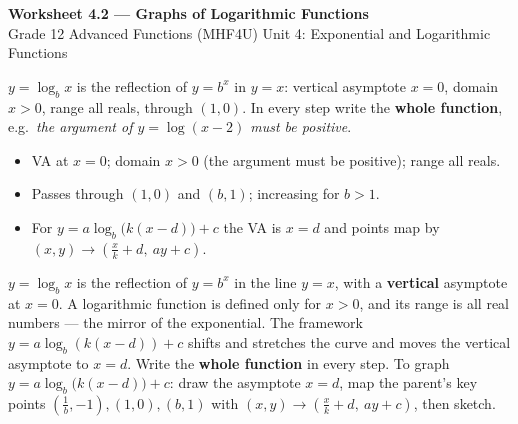 \documentclass[11pt]{article}
\begin{document}
\begin{center}
{\LARGE\bfseries\color{titleblue}Worksheet 4.2 --- Graphs of Logarithmic Functions}\\[2pt]
{\small Grade 12 Advanced Functions (MHF4U) \textperiodcentered{} Unit 4: Exponential and Logarithmic Functions}
\end{center}

\begin{ideabox}
$y=\log_b x$ is the reflection of $y=b^x$ in $y=x$: vertical asymptote $x=0$, domain $x>0$, range all reals, through $(1,0)$. In every step write the \textbf{whole function}, e.g.\ \emph{the argument of $y=\log(x-2)$ must be positive}.
\begin{itemize}[leftmargin=*,itemsep=2pt]
  \item VA at $x=0$; domain $x>0$ (the argument must be positive); range all reals.
  \item Passes through $(1,0)$ and $(b,1)$; increasing for $b>1$.
  \item For $y=a\log_b\big(k(x-d)\big)+c$ the VA is $x=d$ and points map by $(x,y)\to\left(\tfrac xk+d,\ ay+c\right)$.
\end{itemize}
\end{ideabox}

\begin{learnbox}
$y=\log_b x$ is the reflection of $y=b^x$ in the line $y=x$, with a \textbf{vertical} asymptote at $x=0$.
A logarithmic function is defined only for $x>0$, and its range is all real numbers — the mirror of the exponential.
The framework $y=a\log_b\!\left(k(x-d)\right)+c$ shifts and stretches the curve and moves the vertical asymptote to $x=d$.
Write the \textbf{whole function} in every step. To graph $y=a\log_b\!\big(k(x-d)\big)+c$: draw the asymptote $x=d$, map the parent's key points $\left(\tfrac1b,-1\right),(1,0),(b,1)$ with $(x,y)\to\left(\tfrac xk+d,\ ay+c\right)$, then sketch.
\end{learnbox}

\end{document}
